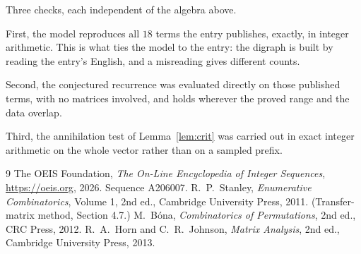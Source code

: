 \documentclass[11pt,a4paper]{article}
\theoremstyle{plain}
\theoremstyle{definition}
\begin{document}
Three checks, each independent of the algebra above.

First, the model reproduces all $18$ terms the entry publishes, exactly, in integer
arithmetic. This is what ties the model to the entry: the digraph is built by reading the
entry's English, and a misreading gives different counts.

Second, the conjectured recurrence was evaluated directly on those published terms, with no
matrices involved, and holds wherever the proved range and the data overlap.

Third, the annihilation test of Lemma~\ref{lem:crit} was carried out in exact integer
arithmetic on the whole vector rather than on a sampled prefix.

\begin{thebibliography}{9}
 The OEIS Foundation, \emph{The On-Line Encyclopedia of Integer
Sequences}, \url{https://oeis.org}, 2026. Sequence A206007.
 R.~P.~Stanley, \emph{Enumerative Combinatorics}, Volume 1, 2nd ed.,
Cambridge University Press, 2011. (Transfer-matrix method, Section 4.7.)
 M.~B\'ona, \emph{Combinatorics of Permutations}, 2nd ed., CRC
Press, 2012.
 R.~A.~Horn and C.~R.~Johnson, \emph{Matrix Analysis}, 2nd ed., Cambridge
University Press, 2013.
\end{thebibliography}
\end{document}
